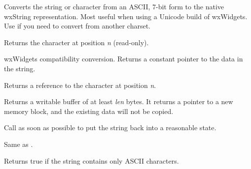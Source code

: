 
Converts the string or character from an ASCII, 7-bit form
to the native wxString representation. Most useful when using
a Unicode build of wxWidgets.
Use  if you
need to convert from another charset.

\label{wxstringgetchar}


Returns the character at position {\it n} (read-only).

\label{wxstringgetdata}


wxWidgets compatibility conversion. Returns a constant pointer to the data in the string.

\label{wxstringgetwritablechar}


Returns a reference to the character at position {\it n}.

\label{wxstringgetwritebuf}


Returns a writable buffer of at least {\it len} bytes.
It returns a pointer to a new memory block, and the
existing data will not be copied.

Call  as soon as possible
to put the string back into a reasonable state.

\label{wxstringindex}



Same as .

%
%
\label{wxstringisascii}


Returns true if the string contains only ASCII characters.

